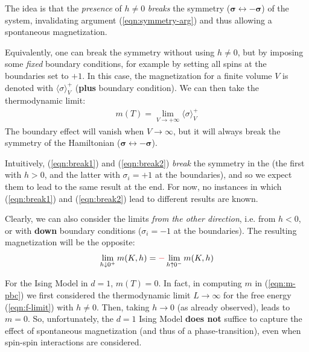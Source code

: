 \documentclass[../../main.tex]{subfiles}
\begin{document}
\medskip

The idea is that the \textit{presence} of $h \neq 0$ \textit{breaks} the symmetry ($\bm{\sigma} \leftrightarrow -\bm{\sigma}$) of the system, invalidating argument (\ref{eqn:symmetry-arg}) and thus allowing a spontaneous magnetization.

\medskip

Equivalently, one can break the symmetry without using $h \neq 0$, but by imposing some \textit{fixed} boundary conditions, for example by setting all spins at the boundaries set to $+1$. In this case, the magnetization for a finite volume $V$ is denoted with $\langle \sigma \rangle_V^+$ (\textbf{plus} boundary condition). We can then take the thermodynamic limit:
\begin{align}\label{eqn:break2}
    m(T) = \lim_{V \to +\infty} \langle \sigma \rangle_V^+
\end{align}
The boundary effect will vanish when $V \to \infty$, but it will always break the symmetry of the Hamiltonian ($\bm{\sigma} \leftrightarrow -\bm{\sigma}$).

\medskip

Intuitively, (\ref{eqn:break1}) and (\ref{eqn:break2}) \textit{break} the symmetry in the  (the first with $h>0$, and the latter with $\sigma_i = +1$ at the boundaries), and so we expect them to lead to the same result at the end. For now, no instances in which (\ref{eqn:break1}) and (\ref{eqn:break2}) lead to different results are known.

\medskip

Clearly, we can also consider the limits \textit{from the other direction}, i.e. from $h < 0$, or with \textbf{down} boundary conditions ($\sigma_i = -1$ at the boundaries). The resulting magnetization will be the opposite:
\begin{align*}
    \lim_{h \downarrow 0^+} m(K,h) = \textcolor{Red}{-} \lim_{h \uparrow 0^-} m(K,h)
\end{align*} 

\label{par:no-phase-transition}
For the Ising Model in $d=1$, $m(T) = 0$. In fact, in computing $m$ in (\ref{eqn:m-pbc}) we first considered the thermodynamic limit $L \to \infty$ for the free energy (\ref{eqn:f-limit}) with $h \neq 0$. Then, taking $h \to 0$ (as already observed), leads to $m = 0$. So, unfortunately, the $d=1$ Ising Model \textbf{does not} suffice to capture the effect of spontaneous magnetization (and thus of a phase-transition), even when spin-spin interactions are considered. 
\end{document}
